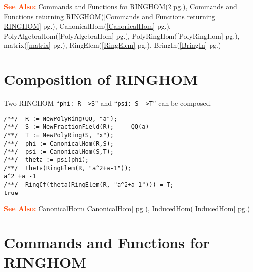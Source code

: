 \documentclass[a4paper]{mybook}
\newcommand\SeeAlso{\par\textcolor{OrangeRed}{\textbf{\large See Also: }}}
\begin{document}
\SeeAlso %
  Commands and Functions for RINGHOM(\ref{Commands and Functions for RINGHOM} pg.\pageref{Commands and Functions for RINGHOM}), 
    Commands and Functions returning RINGHOM(\ref{Commands and Functions returning RINGHOM} pg.\pageref{Commands and Functions returning RINGHOM}), 
    CanonicalHom(\ref{CanonicalHom} pg.\pageref{CanonicalHom}), 
    PolyAlgebraHom(\ref{PolyAlgebraHom} pg.\pageref{PolyAlgebraHom}), 
    PolyRingHom(\ref{PolyRingHom} pg.\pageref{PolyRingHom}), 
    matrix(\ref{matrix} pg.\pageref{matrix}), 
    RingElem(\ref{RingElem} pg.\pageref{RingElem}), 
    BringIn(\ref{BringIn} pg.\pageref{BringIn})

\section{Composition of RINGHOM}
\label{Composition of RINGHOM}

        
Two RINGHOM ``\verb&phi: R-->S&'' and ``\verb&psi: S-->T&''
can be composed.
\begin{Verbatim}[label=example, rulecolor=\color{PineGreen}, frame=single]
/**/  R := NewPolyRing(QQ, "a");
/**/  S := NewFractionField(R);  -- QQ(a)
/**/  T := NewPolyRing(S, "x");
/**/  phi := CanonicalHom(R,S);
/**/  psi := CanonicalHom(S,T);
/**/  theta := psi(phi);
/**/  theta(RingElem(R, "a^2+a-1"));
a^2 +a -1
/**/  RingOf(theta(RingElem(R, "a^2+a-1"))) = T;
true
\end{Verbatim}


\SeeAlso %
  CanonicalHom(\ref{CanonicalHom} pg.\pageref{CanonicalHom}), 
    InducedHom(\ref{InducedHom} pg.\pageref{InducedHom})

\section{Commands and Functions for RINGHOM}
\label{Commands and Functions for RINGHOM}

        
\end{document}
